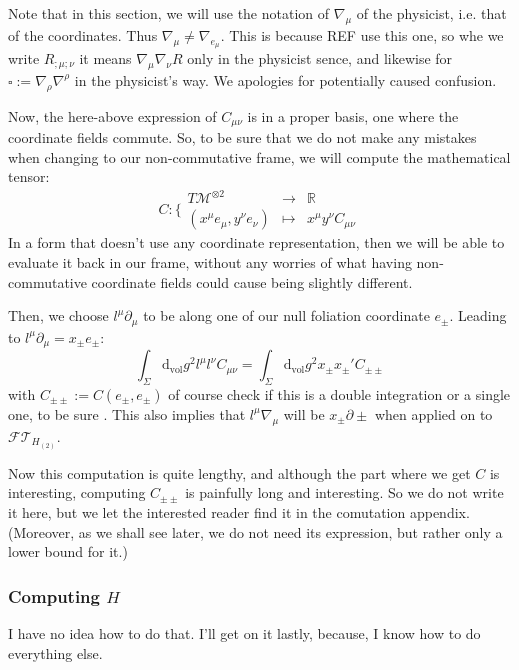 \documentclass[a4paper,11pt]{article}
\numberwithin{equation}{section}
\theoremstyle{definition}
\renewcommand{\d}{{\mathrm{d}}}
\begin{document}
Note that in this section, we will use the notation of $\nabla_\mu$ of the physicist, i.e. that of the coordinates. Thus $\nabla_\mu \ne \nabla_{e_\mu}$. This is because \color{red} REF\color{black} use this one, so whe we write $R_{;\mu;\nu}$ it means $\nabla_\mu \nabla_\nu R$ only in the physicist sence, and likewise for $\square:=\nabla_\rho \nabla^\rho$ in the physicist's way. We apologies for potentially caused confusion.

Now, the here-above expression of $C_{\mu\nu}$ is in a proper basis, one where the coordinate fields commute. So, to be sure that we do not make any mistakes when changing to our non-commutative frame, we will compute the mathematical tensor:
$$C : \Bigg\{\begin{matrix}
    T\mathcal{M}^{\otimes2} & \to & \mathbb{R}\\
    (x^\mu e_\mu, y^\nu e_\nu) & \mapsto & x^\mu y^\nu C_{\mu\nu}
\end{matrix}$$
In a form that doesn't use any coordinate representation, then we will be able to evaluate it back in our frame, without any worries of what having non-commutative coordinate fields could cause being slightly different.

Then, we choose $l^\mu \partial_\mu$ to be along one of our null foliation coordinate $e_\pm$. Leading to $l^\mu \partial_\mu = x_\pm e_\pm$:
\begin{equation}
    \int_\Sigma \d_\mathrm{vol}g^2 l^\mu l^\nu C_{\mu\nu} = \int_\Sigma \d_\mathrm{vol}g^2 x_\pm x_\pm ' C_{\pm\pm}
\end{equation}
with $C_{\pm\pm}:= C(e_\pm,e_\pm)$ of course \color{red} check if this is a double integration or a single one, to be sure \color{black}. This also implies that $l^\mu \nabla_\mu$ will be $x_\pm \partial\pm$ when applied on to $\mathcal{FT}_{H_{(2)}}$.

Now this computation is quite lengthy, and although the part where we get $C$ is interesting, computing $C_{\pm\pm}$ is painfully long and interesting. So we do not write it here, but we let the interested reader find it in the comutation appendix. (Moreover, as we shall see later, we do not need its expression, but rather only a lower bound for it.)


\subsubsection{Computing $H$}
\color{red} I have no idea how to do that. I'll get on it lastly, because, I know how to do everything else. \color{black}
\end{document}
